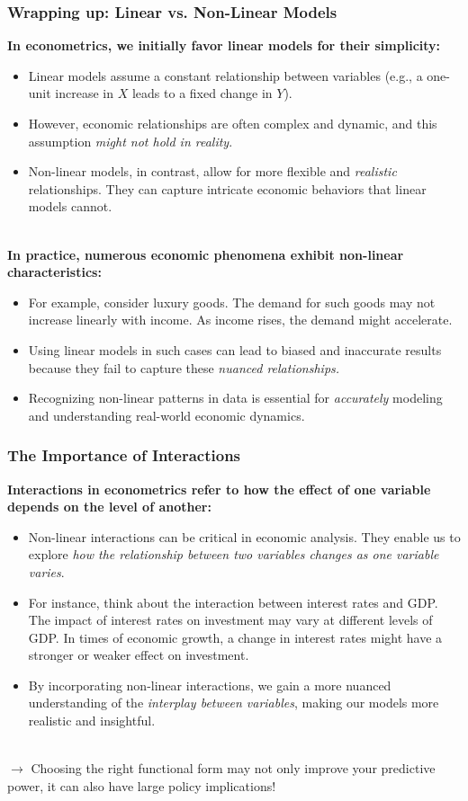 \documentclass[notes,10pt, aspectratio=169]{beamer}
\begin{document}
\begin{frame}
\frametitle{Wrapping up: Linear vs. Non-Linear Models}

\textbf{In econometrics, we initially favor linear models for their simplicity:}
\begin{itemize}
    \item Linear models assume a constant relationship between variables (e.g., a one-unit increase in $X$ leads to a fixed change in $Y$).
    \item However, economic relationships are often complex and dynamic, and this assumption \textit{might not hold in reality}.
    \item Non-linear models, in contrast, allow for more flexible and \textit{realistic} relationships. They can capture intricate economic behaviors that linear models cannot.
\end{itemize}\\[1em]
\textbf{In practice, numerous economic phenomena exhibit non-linear characteristics:}
\begin{itemize}
    \item For example, consider luxury goods. The demand for such goods may not increase linearly with income. As income rises, the demand might accelerate.
    \item Using linear models in such cases can lead to biased and inaccurate results because they fail to capture these \textit{nuanced relationships.}
    \item Recognizing non-linear patterns in data is essential for \textit{accurately} modeling and understanding real-world economic dynamics.
\end{itemize}

\end{frame}




\begin{frame}
\frametitle{The Importance of Interactions}

\textbf{Interactions in econometrics refer to how the effect of one variable depends on the level of another:}
\begin{itemize}
    \item Non-linear interactions can be critical in economic analysis. They enable us to explore \textit{how the relationship between two variables changes as one variable varies}.
    \item For instance, think about the interaction between interest rates and GDP. The impact of interest rates on investment may vary at different levels of GDP. In times of economic growth, a change in interest rates might have a stronger or weaker effect on investment.
    \item By incorporating non-linear interactions, we gain a more nuanced understanding of the \textit{interplay between variables}, making our models more realistic and insightful.
\end{itemize}\\[1em]
$\longrightarrow$ Choosing the right functional form may not only improve your predictive power, it can also have large policy implications!
\end{frame}
\end{document}
